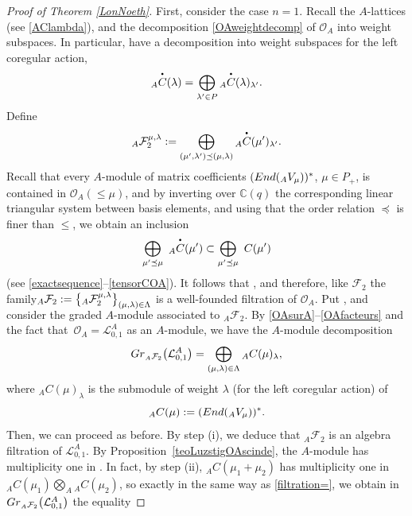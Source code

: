 \documentclass[11pt]{article}
\numberwithin{equation}{section}
\numberwithin{equation}{section}
\theoremstyle{definition}
\newcommand{\mc}{\mathbb{C}}
\newcommand{\Ll}{{\mathcal L}}
\newcommand{\Oo}{{\mathcal O}}
\newcommand{\smallbullet}{%
\vcenter{\hbox{\,\scalebox{0.5}{$\bullet$}\,}}
}
\begin{document}
\begin{proof}[Proof of Theorem \ref{LonNoeth}]
First, consider the case $n=1$. Recall the $A$-lattices \smash{${}_A \overset{\raisebox{-1.5pt}{\scriptsize$\smallbullet$}}{C} (\lambda)$} (see \eqref{AClambda}), and the decomposition \eqref{OAweightdecomp} of $\Oo_A$ into weight subspaces. In particular, have a decomposition into weight subspaces for the left coregular action,
\[{}_A \overset{\raisebox{-1.5pt}{\scriptsize$\smallbullet$}}{C} (\lambda) = \bigoplus_{\lambda'\in P} {}_A \overset{\raisebox{-1.5pt}{\scriptsize$\smallbullet$}}{C} (\lambda)_{\lambda'}.\]
Define
\[{}_A\mathcal{F}_2^{\mu,\lambda} := \bigoplus_{(\mu',\lambda')\preceq (\mu,\lambda)} {}_A \overset{\raisebox{-1.5pt}{\scriptsize$\smallbullet$}}{C} (\mu')_{\lambda'}.\]
Recall that every $A$-module of matrix coefficients $({\rm End}({}_A V_\mu))^*$, $\mu\in P_+$, is contained in $\Oo_A(\leq \mu)$, and by inverting over $\mc(q)$ the corresponding linear triangular system between basis elements, and using that the order relation $\preceq$ is finer than $\leq$, we obtain an inclusion
\[
 \bigoplus_{\mu'\preceq \mu}\ {}_A \overset{\raisebox{-1.5pt}{\scriptsize$\smallbullet$}}{C} (\mu') \subset \bigoplus_{\mu'\preceq \mu} \ C(\mu')
\]
 (see \eqref{exactsequence}--\eqref{tensorCOA}). It follows that \smash{${}_A\mathcal{F}_2^{\mu,\lambda} = \mathcal{F}_2^{\mu,\lambda} \cap \Oo_A$}, and therefore, like $\mathcal{F}_2$ the family${}_A\mathcal{F}_2 :=\smash{\big\{{}_A\mathcal{F}_2^{\mu,\lambda}\big\}_{(\mu,\lambda)\in \Lambda}}$ is a well-founded filtration of $\Oo_A$. Put \smash{${}_A\mathcal{F}_2^{\prec \mu,\lambda} = \mathcal{F}_2^{\prec \mu,\lambda} \cap \Oo_A$}, and consider the graded $A$-module  associated to ${}_A\mathcal{F}_2$. By \eqref{OAsurA}--\eqref{OAfacteurs} and the fact that~${\Oo_A=\Ll_{0,1}^A}$ as an $A$-module, we have the $A$-module decomposition
\[{\rm Gr}_{ {}_A\mathcal{F}_2}\big({\mathcal L}_{0,1}^A\big)=\bigoplus_{(\mu,\lambda)\in \Lambda} {}_AC(\mu)_\lambda,\]
where ${}_AC(\mu)_\lambda$ is the submodule of weight $\lambda$ (for the left coregular action) of
\[{}_AC(\mu) := \left({\rm End}({}_A V_\mu\right))^*.\]
Then, we can proceed as before. By step (i), we deduce that ${}_A\mathcal{F}_2$ is an algebra filtration of $\Ll_{0,1}^A$. By Proposition~\ref{teoLuzstigOAscinde}, the $A$-module \smash{${}_A \overset{\raisebox{-1.5pt}{\scriptsize$\smallbullet$}}{C} (\mu_1+\mu_2)$} has multiplicity one in \smash{${}_A \overset{\raisebox{-1.5pt}{\scriptsize$\smallbullet$}}{C} (\mu_1)\otimes {}_A \overset{\raisebox{-1.5pt}{\scriptsize$\smallbullet$}}{C} (\mu_2)$}. In fact, by step (ii), ${}_AC(\mu_1+\mu_2)$ has multiplicity one in ${}_AC(\mu_1) \bigotimes_A {}_AC(\mu_2)$, so exactly in the same way as \eqref{filtration=}, we obtain in ${\rm Gr}_{ {}_A\mathcal{F}_2}\big({\mathcal L}_{0,1}^A\big)$ the equality

\end{proof}
\end{document}
